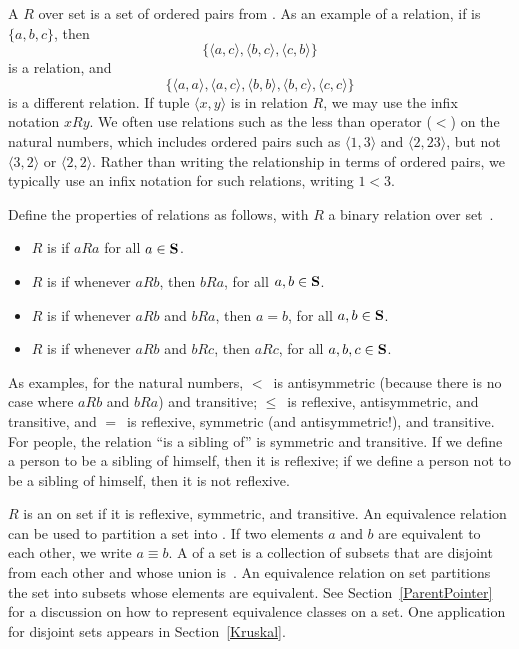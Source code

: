 A  \(R\) over set  is a set of ordered 
pairs from .
As an example of a relation, if  is \(\{a, b, c\}\), then
\[\{ \langle a, c\rangle, \langle b, c\rangle, \langle c, b\rangle \}\]
is a relation, and
\[\{ \langle a, a\rangle, \langle a, c\rangle, \langle b, b\rangle,
\langle b, c\rangle, \langle c, c\rangle \}\]
is a different relation.
If tuple \(\langle x, y\rangle\) is in relation \(R\), we may use the
infix notation \(xRy\).
We often use relations such as the less than operator (\(<\)) on the
natural numbers, which includes ordered pairs such as
\(\langle1, 3\rangle\) and 
\(\langle2, 23\rangle\), but not \(\langle3, 2\rangle\) or
\(\langle2, 2\rangle\).
Rather than writing the relationship in terms of ordered pairs, we
typically use an infix notation for such relations, writing \(1<3\).

Define the properties of relations as follows, with \(R\) a
binary relation over set~.
\begin{itemize}
\item \(R\) is  if \(aRa\)
	for all \(a \in {\textbf{S}}\).
\item \(R\) is  if whenever \(aRb\), then
	\(bRa\), for all \(a, b \in {\textbf{S}}\).
\item \(R\) is  if whenever \(aRb\) and
	\(bRa\), then \(a = b\), for all \(a, b \in {\textbf{S}}\).
\item \(R\) is  if whenever \(aRb\) and
	\(bRc\), then \(aRc\), for all \(a, b, c \in {\textbf{S}}\).
\end{itemize}

As examples, for the natural numbers, \(<\)~is antisymmetric
(because there is no case where \(aRb\) and \(bRa\)) and
transitive; \(\leq\)~is reflexive, antisymmetric, and transitive,
and \(=\)~is reflexive, symmetric (and antisymmetric!),
and transitive.
For people, the relation ``is a sibling of'' is symmetric and
transitive.
If we define a person to be a sibling of himself, then it is
reflexive; if we define a person not to be a sibling of himself, then
it is not reflexive.

\(R\) is an  on set  if it is
reflexive, symmetric, and transitive.
An equivalence relation can be used to partition a set into
.
If two elements \(a\) and \(b\) are equivalent to each other,
we write \(a \equiv b\).
A  of a set  is a collection of subsets that
are disjoint from each other and whose union is~.
An equivalence relation on set  partitions the set into
subsets whose elements are equivalent.
See Section~\ref{ParentPointer} for a discussion on how to represent
equivalence classes on a set.
One application for disjoint sets appears in Section~\ref{Kruskal}.

